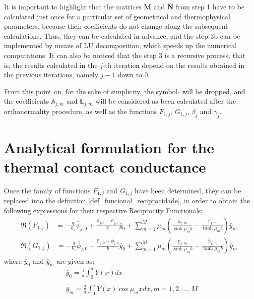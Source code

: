 \documentclass[12pt]{CHT-20}
\begin{document}
It is important to highlight that the matrices $\mathbf{M}$ and $\mathbf{N}$ from step 1 have to be calculated just once for a particular set of geometrical and thermophysical parameters, because their coefficients do not change along the subsequent calculations. Thus, they can be calculated in advance, and the step 3b can be implemented by means of LU decomposition, which speeds up the numerical computations. It can also be noticed that the step 3 is a recursive process, that is, the results calculated in the $j$-th iteration depend on the results obtained in the previous iterations, namely $j - 1$ down to $0$.

From this point on, for the sake of simplicity, the symbol $\hat{}$ will be dropped, and the coefficients $\mathbb{A}_{j,m}$ and $\mathbb{E}_{j,m}$ will be considered as been calculated after the orthonormality procedure, as well as the functions $F_{1,j}$, $G_{1,j}$, $\beta_j$ and $\gamma_j$.
  
\section*{Analytical formulation for the thermal contact conductance}

Once the family of functions $F_{1,j}$ and $G_{1,j}$ have been determined, they can be replaced into the definition \eqref{def_funcional_reciprocidade}, in order to obtain the following expressions for their respective Reciprocity Functionals:
\begin{align}
\Re(F_{1,j})
& =
-\frac{q}{k_1}\bar{\psi}_{j,0} + \frac{\mathbb{A}_{j,0} - \bar{\psi}_{j,0}}{b} \bar{y}_0 +
\sum_{m=1}^M \mu_m \left(\frac{\mathbb{A}_{j,m}}{\sinh\mu_m b} - \frac{\bar{\psi}_{j, m}}{\tanh\mu_m b}\right)\bar{y}_m
\label{calculo_FR_F1_antes_b} 
\end{align}
\begin{align}
\Re(G_{1,j})
& =
-\frac{q}{k_1}\bar{\phi}_{j,0} + \frac{\mathbb{E}_{j,0} - \bar{\phi}_{j,0}}{b} \bar{y}_0 + 
\sum_{m=1}^M \mu_m \left(\frac{\mathbb{E}_{j,m}}{\sinh\mu_m b} - \frac{\bar{\phi}_{j, m}}{\tanh\mu_m b}\right)\bar{y}_m
\label{calculo_FR_G1_antes_b}
\end{align}
where $\bar{y}_0$ and $\bar{y}_m$ are given as:
\begin{align}
& \bar{y}_0 = \frac{1}{a}\int_0^a Y(x) dx \label{coef_it_0} \\  \nonumber \\
& \bar{y}_m = \frac{2}{a}\int_0^a Y(x) \cos\mu_m x dx, m = 1, 2, ..., M \label{coef_it_m}
\end{align}
\end{document}
